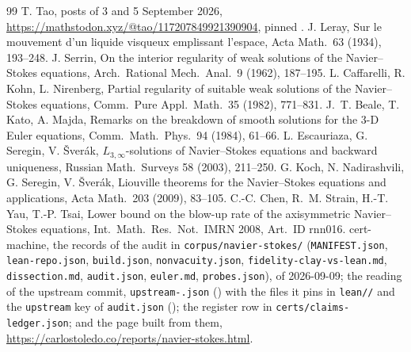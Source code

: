 \documentclass[11pt]{article}
\begin{document}
\begin{thebibliography}{99}
 T. Tao, posts of 3 and 5 September 2026,
\url{https://mathstodon.xyz/@tao/117207849921390904}, pinned \CorpusFetched.
 J. Leray, Sur le mouvement d'un liquide visqueux emplissant l'espace, Acta
Math.\ 63 (1934), 193--248.
 J. Serrin, On the interior regularity of weak solutions of the Navier--Stokes
equations, Arch.\ Rational Mech.\ Anal.\ 9 (1962), 187--195.
 L. Caffarelli, R. Kohn, L. Nirenberg, Partial regularity of suitable weak
solutions of the Navier--Stokes equations, Comm.\ Pure Appl.\ Math.\ 35 (1982), 771--831.
 J.~T. Beale, T. Kato, A. Majda, Remarks on the breakdown of smooth solutions
for the 3-D Euler equations, Comm.\ Math.\ Phys.\ 94 (1984), 61--66.
 L. Escauriaza, G. Seregin, V. \v{S}ver\'ak, $L_{3,\infty}$-solutions of
Navier--Stokes equations and backward uniqueness, Russian Math.\ Surveys 58 (2003), 211--250.
 G. Koch, N. Nadirashvili, G. Seregin, V. \v{S}ver\'ak, Liouville theorems for
the Navier--Stokes equations and applications, Acta Math.\ 203 (2009), 83--105.
 C.-C. Chen, R.~M. Strain, H.-T. Yau, T.-P. Tsai, Lower bound on the blow-up
rate of the axisymmetric Navier--Stokes equations, Int.\ Math.\ Res.\ Not.\ IMRN 2008, Art.\
ID rnn016.
 cert-machine, the records of the audit in \texttt{corpus/navier-stokes/}
(\texttt{MANIFEST.json}, \texttt{lean-repo.json}, \texttt{build.json},
\texttt{nonvacuity.json}, \texttt{fidelity-clay-vs-lean.md}, \texttt{dissection.md},
\texttt{audit.json}, \texttt{euler.md}, \texttt{probes.json}), of 2026-09-09; the reading of
the upstream commit, \texttt{upstream-\UpCommit.json} (\UpBuildDate) with the \UpPinnedFiles{}
files it pins in \texttt{lean/\UpCommit/} and the \texttt{upstream} key of \texttt{audit.json}
(\UpReadOn); the register row \texttt{\LedgerId} in \texttt{certs/claims-ledger.json}; and
the page built from them, \url{https://carlostoledo.co/reports/navier-stokes.html}.
\end{thebibliography}
\end{document}
